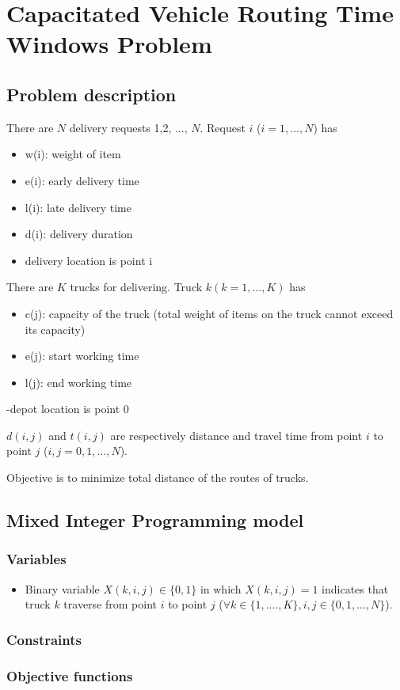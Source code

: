 \section{Capacitated Vehicle Routing Time Windows Problem}

\subsection{Problem description}
There are $N$ delivery requests 1,2, ..., $N$. Request $i$ ($i=1,...,N$) has
\begin{itemize}
\item w(i): weight of item
\item e(i): early delivery time
\item l(i): late delivery time
\item d(i): delivery duration
\item delivery location is point i
\end{itemize}

There are $K$ trucks for delivering. Truck $k (k=1,\dots,K)$ has
\begin{itemize}
\item c(j): capacity of the truck (total weight of items on the truck cannot exceed its capacity)
\item e(j): start working time
\item l(j): end working time
\end{itemize}

-depot location is point 0

$d(i,j)$ and $t(i,j)$ are respectively distance and travel time from point $i$ to point $j$ ($i,j = 0,1,...,N$).

Objective is to minimize total distance of the routes of trucks.
\subsection{Mixed Integer Programming model}
\subsubsection{Variables}
\begin{itemize}
	\item Binary variable $X(k,i,j)\in\{0,1\}$ in which $X(k,i,j)=1$ indicates that truck $k$ traverse from point $i$ to point $j$ ($\forall k\in \{1,.\dots,K\}, i,j\in\{0,1,\dots,N\}$).
\end{itemize}
\subsubsection{Constraints}

\subsubsection{Objective functions}
